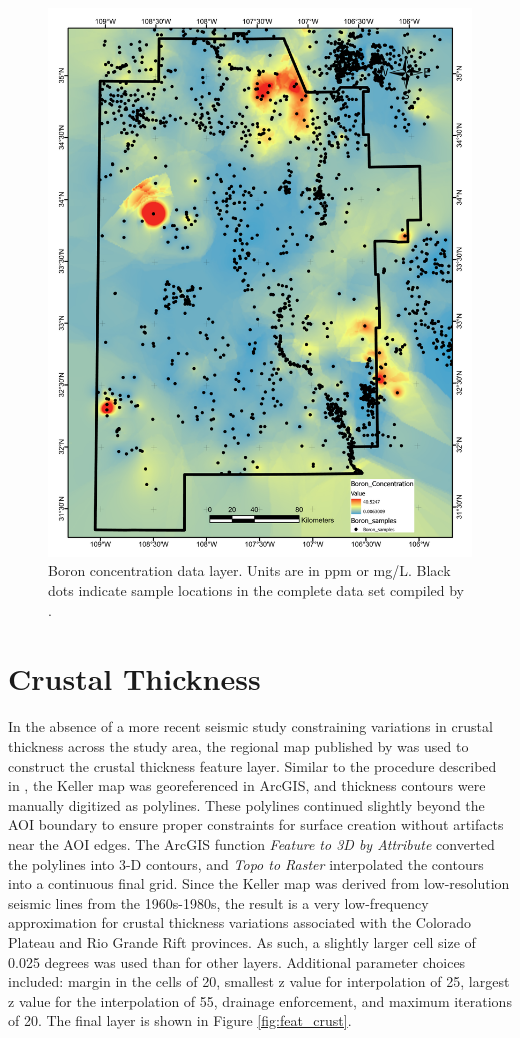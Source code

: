\begin{figure}[H]
\centering
\includegraphics[width=0.75\linewidth]{templates/images/Figure-Boron.pdf}
\caption[Boron concentration data layer]{Boron concentration data layer. Units are in ppm or mg/L. Black dots indicate sample locations in the complete data set compiled by \protect\citet{bielicki_hydrogeolgic_2015}.}
\label{fig:feat_boron}
\end{figure}
\pagebreak

\section{Crustal Thickness}\label{app:dl_crustal_thickness}
In the absence of a more recent seismic study constraining variations in crustal thickness across the study area, the regional map published by \citet{keller_comparative_1991} was used to construct the crustal thickness feature layer. Similar to the procedure described in \citep{pepin_new_2019}, the Keller map was georeferenced in ArcGIS, and thickness contours were manually digitized as polylines. These polylines continued slightly beyond the AOI boundary to ensure proper constraints for surface creation without artifacts near the AOI edges. The ArcGIS function \textit{Feature to 3D by Attribute} converted the polylines into 3-D contours, and \textit{Topo to Raster} interpolated the contours into a continuous final grid. Since the Keller map was derived from low-resolution seismic lines from the 1960s-1980s, the result is a very low-frequency approximation for crustal thickness variations associated with the Colorado Plateau and Rio Grande Rift provinces. As such, a slightly larger cell size of 0.025 degrees was used than for other layers. Additional parameter choices included: margin in the cells of 20, smallest z value for interpolation of 25, largest z value for the interpolation of 55, drainage enforcement, and maximum iterations of 20. The final layer is shown in Figure \ref{fig:feat_crust}.
\vfill
\pagebreak

